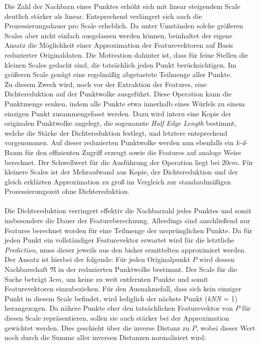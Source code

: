 Die Zahl der Nachbarn eines Punktes erhöht sich mit linear steigendem Scale deutlich stärker als linear. Entsprechend verlängert sich auch die Prozessierungsdauer pro Scale erheblich. Da unter Umständen solche größeren Scales aber nicht einfach ausgelassen werden können, beinhaltet der eigene Ansatz die Möglichkeit einer Approximation der Featurevektoren auf Basis reduzierter Originaldaten. Die Motivation dahinter ist, dass für feine Stellen die kleinen Scales gedacht sind, die tatsächlich jeden Punkt berücksichtigen. Im größeren Scale genügt eine regelmäßig abgetastete Teilmenge aller Punkte.  \\
Zu diesem Zweck wird, noch vor der Extraktion der Features, eine Dichtereduktion auf der Punktwolke ausgeführt. Diese Operation kann die Punktmenge senken, indem alle Punkte etwa innerhalb eines Würfels zu einem einzigen Punkt zusammengefasst werden. Dazu wird intern eine Kopie der originalen Punktwolke angelegt, die sogenannte \textit{Half Edge Length} bestimmt, welche die Stärke der Dichtereduktion festlegt, und letztere entsprechend vorgenommen. Auf dieser reduzierten Punktwolke werden nun ebenfalls ein \textit{k-d}-Baum für den effizienten Zugriff erzeugt sowie die Features auf analoge Weise berechnet. Der Schwellwert für die Ausführung der Operation liegt bei 20$cm$. Für kleinere Scales ist der Mehraufwand aus Kopie, der Dichtereduktion und der gleich erklärten Approximation zu groß im Vergleich zur standardmäßigen Prozessierungszeit ohne Dichtereduktion. \\\\
Die Dichtereduktion verringert effektiv die Nachbarzahl jedes Punktes und somit insbesondere die Dauer der Featureberechnung. Allerdings sind anschließend nur Features berechnet worden für eine Teilmenge der ursprünglichen Punkte. Da für jeden Punkt ein vollständiger Featurevektor erwartet wird für die letztliche \textit{Prediction}, muss dieser jeweils aus den bisher ermittelten approximiert werden. Der Ansatz ist hierbei der folgende: Für jeden Originalpunkt $P$ wird dessen Nachbarschaft $\mathfrak{N}$ in der reduzierten Punktwolke bestimmt. Der Scale für die Suche beträgt 3$cm$, um keine zu weit entfernten Punkte und somit Featurevektoren einzubeziehen. Für den Ausnahmefall, dass sich kein einziger Punkt in diesem Scale befindet, wird lediglich der nächste Punkt (\textit{kNN} = 1) herangezogen. Da nähere Punkte eher den tatsächlichen Featurevektor von $P$ für diesen Scale repräsentieren, sollen sie auch stärker bei der Approximation gewichtet werden. Dies geschieht über die inverse Distanz zu $P$, wobei dieser Wert noch durch die Summe aller inversen Distanzen normalisiert wird:
